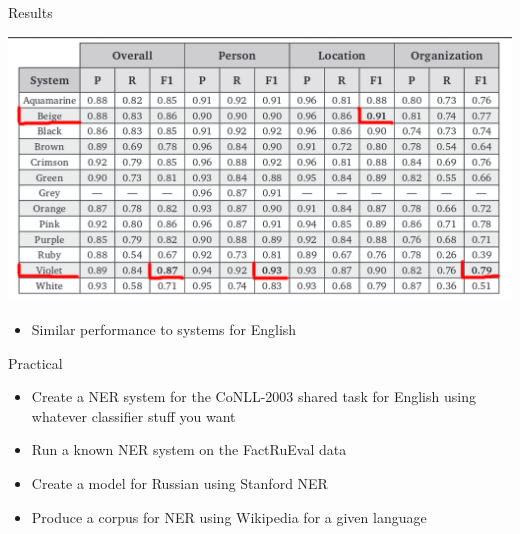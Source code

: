 \documentclass[10pt, compress]{beamer}
\begin{document}
\begin{frame}{Results}

\begin{center}
\includegraphics[width=\textwidth]{graphics/factrueval-results.png}
\end{center}

\begin{itemize}
  \item Similar performance to systems for English
\end{itemize}


\end{frame}

\begin{frame}[standout]
Practical
\end{frame}

\begin{frame}

\begin{itemize}
 \item Create a NER system for the CoNLL-2003 shared task for English using
   whatever classifier stuff you want
 \item Run a known NER system on the FactRuEval data
 \item Create a model for Russian using Stanford NER
 \item Produce a corpus for NER using Wikipedia for a given language
\end{itemize}

\end{frame}
\end{document}
